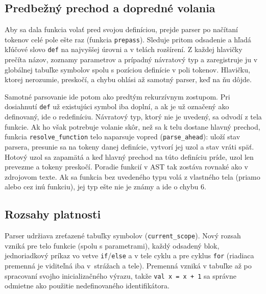 \subsection{Predbežný prechod a dopredné volania}
Aby sa dala funkcia volať pred svojou definíciou, prejde parser po načítaní tokenov celé pole ešte raz (funkcia \texttt{prepass}). Sleduje pritom odsadenie a hľadá kľúčové slovo \texttt{def} na najvyššej úrovni a v telách rozšírení. Z každej hlavičky prečíta názov, zoznamy parametrov a prípadný návratový typ a zaregistruje ju v globálnej tabuľke symbolov spolu s pozíciou definície v poli tokenov. Hlavičku, ktorej nerozumie, preskočí, a chybu ohlási až samotný parser, keď na ňu dôjde.

Samotné parsovanie ide potom ako predtým rekurzívnym zostupom. Pri dosiahnutí \texttt{def} už existujúci symbol iba doplní, a ak je už označený ako definovaný, ide o redefiníciu. Návratový typ, ktorý nie je uvedený, sa odvodí z tela funkcie. Ak ho však potrebuje volanie skôr, než sa k telu dostane hlavný prechod, funkcia \texttt{resolve\_function} telo naparsuje vopred (\texttt{parse\_ahead}): uloží stav parsera, presunie sa na tokeny danej definície, vytvorí jej uzol a stav vráti späť. Hotový uzol sa zapamätá a keď hlavný prechod na túto definíciu príde, uzol len prevezme a tokeny preskočí. Poradie funkcií v AST tak zostáva rovnaké ako v zdrojovom texte. Ak sa funkcia bez uvedeného typu volá z vlastného tela (priamo alebo cez inú funkciu), jej typ ešte nie je známy a ide o chybu 6.

\subsection{Rozsahy platnosti}
Parser udržiava zreťazené tabuľky symbolov (\texttt{current\_scope}). Nový rozsah vzniká pre telo funkcie (spolu s parametrami), každý odsadený blok, jednoriadkový príkaz vo vetve \texttt{if}/\texttt{else} a v tele cyklu a pre cyklus \texttt{for} (riadiaca premenná je viditeľná iba v~strážach a tele). Premenná vzniká v tabuľke až po spracovaní svojho inicializačného výrazu, takže \texttt{val x = x + 1} sa správne odmietne ako použitie nedefinovaného identifikátora.

